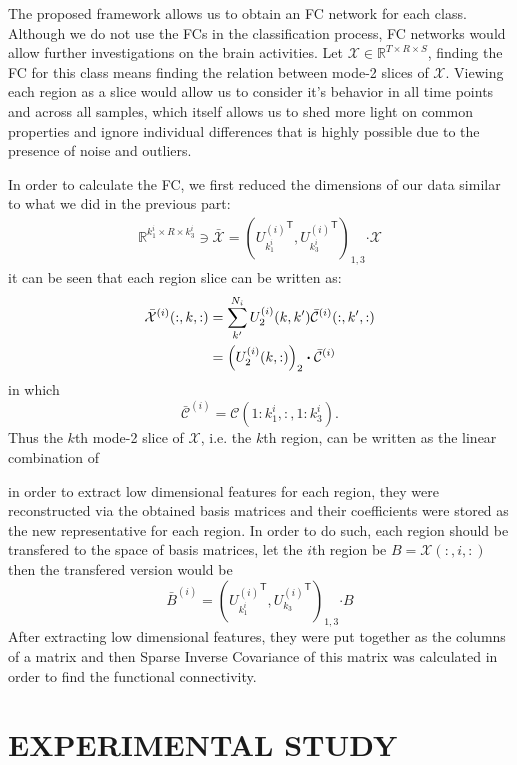 \documentclass[journal]{IEEEtran}
\newcommand{\trans}{\mathsf{T}}
\begin{document}
	The proposed framework allows us to obtain an FC network for each class. Although we do not use the FCs in the classification process, FC networks would allow further investigations on the brain activities. Let $\mathcal{X} \in \mathbb{R}^{T \times R \times S}$, finding the FC for this class means finding the relation between mode-2 slices of $\mathcal{X}$. Viewing each region as a slice would allow us to consider it's behavior in all time points and across all samples, which itself allows us to shed more light on common properties and ignore individual differences that is highly possible due to the presence of noise and outliers. 
	
	In order to calculate the FC, we first reduced the dimensions of our data similar to what we did in the previous part: 
	\begin{align}
	\mathbb{R}^{k_1^i \times R \times k_3^i} \ni  \bar{{\mathcal{X}}} = \left( 
	{U_{k_1^i}^{(i)}}^{\trans}, {U_{k^i_3}^{(i)}}^{\trans} 
	\right)_{1,3}\boldsymbol{\cdot} \mathcal{X} \label{DR_Version_FC}
	\end{align}
	it can be seen that each region slice can be written as:
	\begin{align}
	\bar{\mathcal{X}}^{(i)}(:,k,:) &= \sum_{k'}^{N_i} U_2^{(i)}(k,k')\bar{\mathcal{C}}^{(i)}(:,k',:) \notag
	\\&= \left( U_{2}^{(i)}(k,:)\right)_2 \boldsymbol{\cdot} \bar{\mathcal{C}}^{(i)}
	\end{align}
	in which 
	\[
	\bar{\mathcal{C}}^{(i)} = \mathcal{C}(1:k_1^i,:,1:k_3^i).
	\]
	Thus the $k$th mode-2 slice of $\mathcal{X}$, i.e. the $k$th region, can be written as the linear combination of 
	
	in order to extract low dimensional features for each region, they were reconstructed via the obtained basis matrices and their coefficients were stored as the new representative for each region. In order to do such, each region should be transfered to the space of basis matrices, let the $i$th region be $B = \mathcal{X}(:,i,:)$ then the transfered version would be
	\[
	\bar{B}^{(i)} = \left( 
	{U_{k_1^i}^{(i)}}^{\trans},  {U_{k_3}^{(i)}}^{\trans} 
	\right)_{1,3} \boldsymbol{\cdot} B 
	\]
	After extracting low dimensional features, they were put together as the columns of a matrix and then Sparse Inverse Covariance of this matrix was calculated in order to find the functional connectivity.
	
	
	\section{EXPERIMENTAL STUDY}
\end{document}
